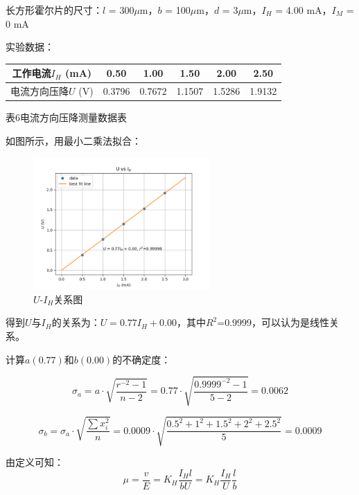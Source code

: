 \documentclass[UTF8]{ctexart}
\begin{document}
长方形霍尔片的尺寸：$l$ = 300$\mu$m，$b$ = 100$\mu$m，$d$ = 3$\mu$m，$I_H$ = 4.00 mA，$I_M$ = 0 mA

实验数据：

\begin{center}
    \begin{tabular}{|c|c|c|c|c|c|}
        \hline
        工作电流$I_H$ (mA) & 0.50 & 1.00 & 1.50 & 2.00 & 2.50 \\\hline
        电流方向压降$U$ (V) & 0.3796 & 0.7672 & 1.1507 & 1.5286 & 1.9132 \\\hline
    \end{tabular}
    \begin{minipage}{0.8\textwidth}
        \centering
        \fontsize{9pt}{\baselineskip}\selectfont
        表6\quad 电流方向压降测量数据表
    \end{minipage}
\end{center}

如图所示，用最小二乘法拟合：

\begin{center}
    \begin{figure}[H]
        \centering
        \includegraphics[width=0.6\textwidth]{img/Current_vs_voltage.png}
        \caption{$U$-$I_H$关系图}
        \label{U-I_H}
    \end{figure}
\end{center}

得到$U$与$I_H$的关系为：$U = 0.77I_H + 0.00$，其中$R^2$=0.9999，可以认为是线性关系。

计算$a(0.77)$和$b(0.00)$的不确定度：

$$\sigma_a=a\cdot\sqrt{\frac{r^{-2}-1}{n-2}}=0.77\cdot\sqrt{\frac{0.9999^{-2}-1}{5-2}}=0.0062$$

$$\sigma_b=\sigma_a\cdot\sqrt{\frac{\sum x_i^2}{n}}=0.0009\cdot\sqrt{\frac{0.5^2+1^2+1.5^2+2^2+2.5^2}{5}}=0.0009$$

由定义可知：$$\mu=\frac{v}{E}=K_H\frac{I_Hl}{bU}=K_H\frac{I_H}{U}\frac{l}{b}$$
\end{document}
